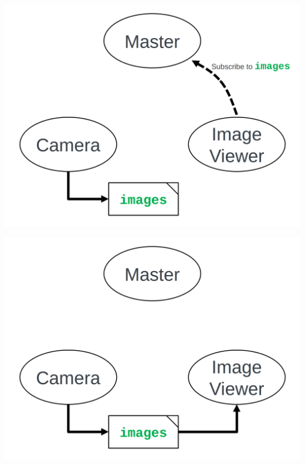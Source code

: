\documentclass{beamer}
\begin{document}
     \begin{frame}[plain]{}
         \centering
         \includegraphics[width =1.0\linewidth]{figures/master3.png}                                                              
        \end{frame} 
     \begin{frame}[plain]{}
         \centering
         \includegraphics[width =1.0\linewidth]{figures/master4.png}                                                              
        \end{frame}
\end{document}
